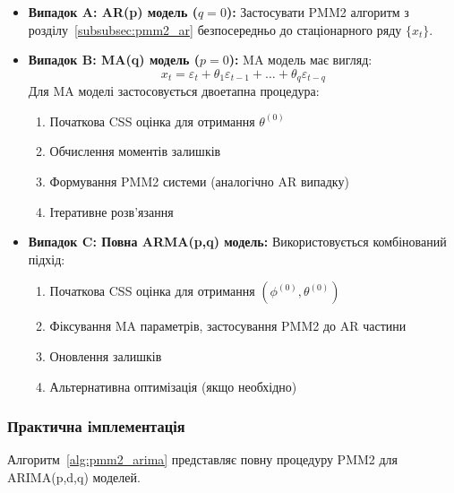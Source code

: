 \begin{itemize}
    \item \textbf{Випадок A: AR(p) модель ($q=0$):} Застосувати PMM2 алгоритм з розділу~\ref{subsubsec:pmm2_ar} безпосередньо до стаціонарного ряду $\{x_t\}$.

    \item \textbf{Випадок B: MA(q) модель ($p=0$):} MA модель має вигляд:
    \begin{equation}
    \label{eq:ma_model}
    x_t = \varepsilon_t + \theta_1 \varepsilon_{t-1} + \ldots + \theta_q \varepsilon_{t-q}
    \end{equation}
    Для MA моделі застосовується двоетапна процедура:
    \begin{enumerate}
        \item Початкова CSS оцінка для отримання $\theta^{(0)}$
        \item Обчислення моментів залишків
        \item Формування PMM2 системи (аналогічно AR випадку)
        \item Ітеративне розв'язання
    \end{enumerate}

    \item \textbf{Випадок C: Повна ARMA(p,q) модель:} Використовується комбінований підхід:
    \begin{enumerate}
        \item Початкова CSS оцінка для отримання $(\phi^{(0)}, \theta^{(0)})$
        \item Фіксування MA параметрів, застосування PMM2 до AR частини
        \item Оновлення залишків
        \item Альтернативна оптимізація (якщо необхідно)
    \end{enumerate}
\end{itemize}

\subsubsection{Практична імплементація}
\label{subsubsec:practical_implementation}

Алгоритм~\ref{alg:pmm2_arima} представляє повну процедуру PMM2 для ARIMA(p,d,q) моделей.

